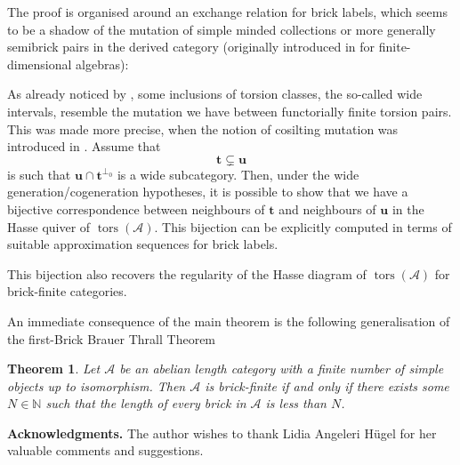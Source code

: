 \documentclass[11pt]{amsart}
\newtheorem{theorem}{Theorem}[section]
\theoremstyle{definition}
\newcommand{\A}{\mathcal A}
\newcommand{\tors}{\operatorname{tors}}
\begin{document}
The proof is organised around an exchange relation for brick labels, which seems to be a shadow of the mutation of simple minded collections or more generally semibrick pairs in the derived category (originally introduced in \cite{SimpleMindOrig} for finite-dimensional algebras): 

 As already noticed by \cite{AsaiPfeifer}, some inclusions of torsion classes, the so-called wide intervals, resemble the mutation we have between functorially finite torsion pairs. This was made more precise, when the notion of cosilting mutation was introduced in \cite{ALSV}. 
Assume that
\[
\mathbf t \subsetneq \mathbf u
\]
is such that \( \mathbf{u} \cap \mathbf{t}^{\perp_0} \) is a wide subcategory. Then, under the wide generation/cogeneration hypotheses, it is possible to show that  we have a bijective correspondence between neighbours of \( \mathbf{t} \)  and neighbours of \( \mathbf{u} \) in the Hasse quiver of \( \tors(\A) \). This bijection can be explicitly computed in terms of suitable approximation sequences for brick labels.

This bijection also recovers the regularity of the Hasse diagram of \( \tors(\A) \) for brick-finite categories.

An immediate consequence of the main theorem is the following generalisation of the first-Brick Brauer Thrall Theorem 

\begin{theorem}\label{thm:intro-bbt}
Let \(\A\) be an abelian length category with a finite number of simple objects up to isomorphism. Then \(\A\) is brick-finite if and only if there exists some \(N\in\mathbb N\) such that the length of every brick in \(\A\) is less than \(N\).
\end{theorem}

\noindent\textbf{Acknowledgments.} The author wishes to thank Lidia Angeleri H\"ugel for her valuable comments and suggestions.
\end{document}
